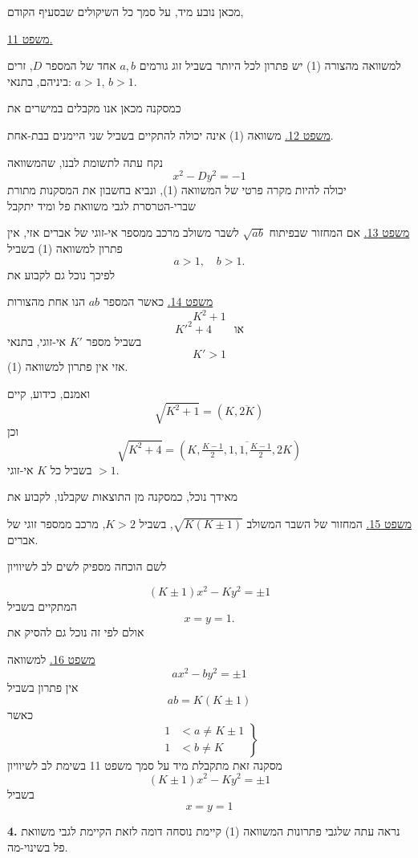 \noindent מכאן נובע מיד, על סמך כל השיקולים שבסעיף הקודם,

\medskip
\noindent\underline{משפט 11.}

\noindent למשוואה מהצורה (1) יש פתרון לכל היותר בשביל זוג גורמים $a,b$ אחד של המספר $D$, זרים ביניהם, בתנאי: $a>1$, $b>1$.

\noindent כמסקנה מכאן אנו מקבלים במישרים את

\medskip
\noindent\underline{משפט 12.} משוואה (1) אינה יכולה להתקיים בשביל שני היימנים בבת-אחת.

\medskip
\noindent נקח עתה לתשומת לבנו, שהמשוואה
\[ x^2 - Dy^2 = -1 \]
יכולה להיות מקרה פרטי של המשוואה (1), ונביא בחשבון את המסקנות מתורת שברי-הטרסרת לגבי משוואת פל ומיד יתקבל

\medskip
\noindent\underline{משפט 13.} אם המחזור שבפיתוח $\sqrt{ab}$ לשבר משולב מרכב ממספר אי-זוגי של אברים אזי, אין פתרון למשוואה (1) בשביל
\[ a>1 , \quad b>1 . \]
לפיכך נוכל גם לקבוע את

\medskip
\noindent\underline{משפט 14.} כאשר המספר $ab$ הנו אחת מהצורות
\[ K^2 + 1 \]
\[ K'^2 + 4 \qquad \text{או} \]
בשביל מספר $K'$ אי-זוגי, בתנאי
\[ K' > 1 \]
אזי אין פתרון למשוואה (1).

\noindent ואמנם, כידוע, קיים
\[ \sqrt{K^2+1} = (K, \overline{2K}) \]
וכן
\[ \sqrt{K^2+4} = \left(K, \overline{\tfrac{K-1}{2}, 1, 1, \tfrac{K-1}{2}, 2K}\right) \]
בשביל כל $K$ אי-זוגי $>1$.

\noindent מאידך נוכל, כמסקנה מן התוצאות שקבלנו, לקבוע את

\medskip
\noindent\underline{משפט 15.} המחזור של השבר המשולב $\sqrt{K(K\pm1)}$, בשביל $K>2$, מרכב ממספר זוגי של אברים.

\noindent לשם הוכחה מספיק לשים לב לשיוויון

\[ (K \pm 1)x^2 - Ky^2 = \pm 1 \]
המתקיים בשביל
\[ x = y = 1 . \]
אולם לפי זה נוכל גם להסיק את

\medskip
\noindent\underline{משפט 16.} למשוואה
\[ ax^2 - by^2 = \pm 1 \]
אין פתרון בשביל
\[ ab = K(K\pm1) \]
כאשר
\[ \left. \begin{aligned} 1 &< a \neq K\pm1 \\ 1 &< b \neq K \end{aligned} \right\} \]
מסקנה זאת מתקבלת מיד על סמך משפט 11 בשימת לב לשיוויון
\[ (K\pm1)x^2 - Ky^2 = \pm 1 \]
בשביל
\[ x = y = 1 \]

\bigskip
\noindent\textbf{4.} נראה עתה שלגבי פתרונות המשוואה (1) קיימת נוסחה דומה לזאת הקיימת לגבי משוואת פל בשינוי-מה.

